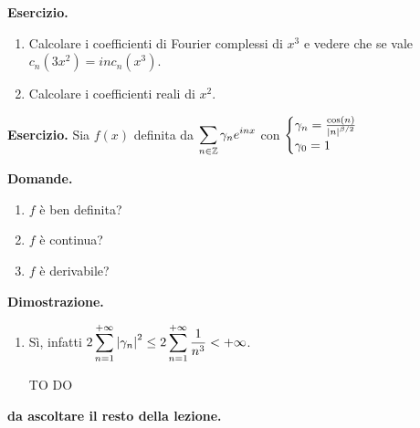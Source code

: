 \textbf{Esercizio.}
\begin{enumerate}
\item Calcolare i coefficienti di Fourier complessi di $x^3$ e vedere che se vale $c_n(3x^2) = i n c_n(x^3)$.

\item Calcolare i coefficienti reali di $x^2$.
\end{enumerate}

\textbf{Esercizio.} Sia $f(x)$ definita da $\displaystyle \sum_{n \in \mathbb Z} \gamma_n e^{inx} $ con $\ds  %
\begin{cases}
\gamma_n = \frac{\cos(n)}{\left| n \right|^{\beta / 2}} \\
\gamma_0 = 1
\end{cases}
$

\textbf{Domande.}
\begin{enumerate}
\item $f$ è ben definita?

\item $f$ è continua?

\item $f$ è derivabile?
\end{enumerate}

\textbf{Dimostrazione.}
\begin{enumerate}
\item Sì, infatti $\displaystyle 2 \sum_{n=1}^{+\infty} \left| \gamma_n \right|^2 \leq 2 \sum_{n=1}^{+\infty} \frac{1}{n^3} < +\infty $.

\item [TO DO]

\end{enumerate}


\textbf{da ascoltare il resto della lezione.}

